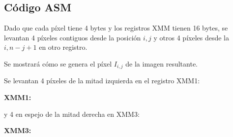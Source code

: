 \subsection{Código ASM}
\par{Dado que cada píxel tiene 4 bytes y los registros XMM tienen 16 bytes, se levantan 4 píxeles contiguos desde la posición $i,j$ y otros 4 píxeles desde la $i, n-j+1$ en otro registro.}
\par{Se mostrará cómo se genera el píxel $I_{i,j}$ de la imagen resultante.}
\par{Se levantan 4 píxeles de la mitad izquierda en el registro XMM1:}
\par{\textbf{XMM1:}}
\par{y 4 en espejo de la mitad derecha en XMM3:}\\
\par{\textbf{XMM3:}}

